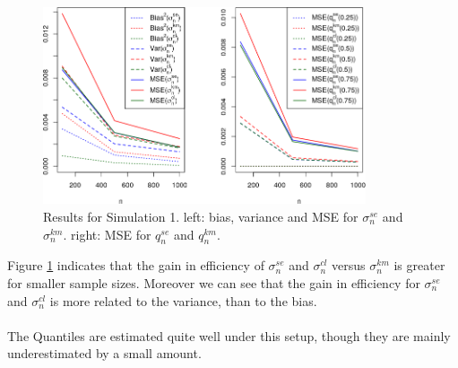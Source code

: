 \begin{figure}[h!]
	\begin{center}
		\includegraphics[width=0.85\textwidth]{./figures/expexp_mse2}
	\end{center}
	\caption{Results for Simulation 1. left: bias, variance and MSE for $\sigma_n^{se}$ and $\sigma_n^{km}$. right: MSE for $q_n^{se}$ and $q_n^{km}$.}
	\label{fig:mse_expexp}
\end{figure}
%
\clearpage
%
Figure \ref{fig:mse_expexp} indicates that the gain in efficiency of $\sigma_n^{se}$ and $\sigma_n^{cl}$ versus $\sigma_n^{km}$ is greater for smaller sample sizes. Moreover we can see that the gain in efficiency for $\sigma_{n}^{se}$ and $\sigma_n^{cl}$ is more related to the variance, than to the bias.\\
\\
The Quantiles are estimated quite well under this setup, though they are mainly underestimated by a small amount. 
%
